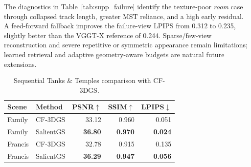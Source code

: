 \documentclass[sigconf]{acmart}
\begin{document}
\begin{table}[t]
    \centering
    \footnotesize
    \caption{Failure diagnostics and fallback on representative Mip-NeRF 360 scenes. Residual is the normalized early epipolar residual.}
    \label{tab:supp_failure}
\end{table}

The diagnostics in Table~\ref{tab:supp_failure} identify the texture-poor \textit{room} case through collapsed track length, greater MST reliance, and a high early residual. A feed-forward fallback improves the failure-view LPIPS from 0.312 to 0.235, slightly better than the VGGT-X reference of 0.244. Sparse/few-view reconstruction and severe repetitive or symmetric appearance remain limitations; learned retrieval and adaptive geometry-aware budgets are natural future extensions.

\begin{table}[t]
    \centering
    \footnotesize
    \caption{Sequential Tanks \& Temples comparison with CF-3DGS.}
    \label{tab:supp_cf3dgs}
    \begin{tabular}{llrrr}
        \toprule
        Scene & Method & PSNR$\uparrow$ & SSIM$\uparrow$ & LPIPS$\downarrow$ \\
        \midrule
        Family & CF-3DGS & 33.12 & 0.960 & 0.051 \\
        Family & SalientGS & \textbf{36.80} & \textbf{0.970} & \textbf{0.024} \\
        Francis & CF-3DGS & 32.78 & 0.915 & 0.135 \\
        Francis & SalientGS & \textbf{36.29} & \textbf{0.947} & \textbf{0.056} \\
        \bottomrule
    \end{tabular}
\end{table}

\clearpage


\end{document}
